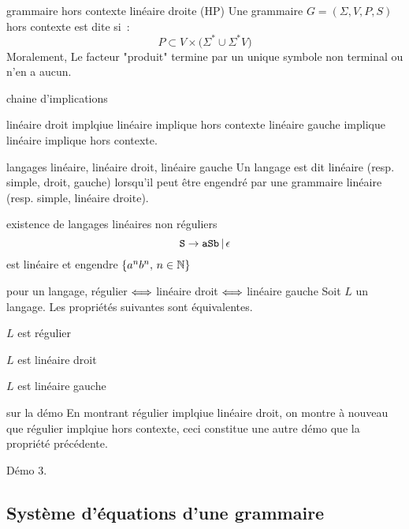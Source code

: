 \begin{adjustwidth}{-3cm}{-3cm}
\begin{definition}{}{grammaire hors contexte linéaire droite (HP)}
    Une grammaire $G = (\Sigma, V, P, S)$ hors contexte est dite  si~:
        $$P \subset V \times \big( \Sigma^* \cup \Sigma^*V \big)$$
    Moralement, Le facteur "produit" termine par un unique symbole non terminal ou n'en a aucun.
\end{definition}

\begin{remarque}{}{chaine d'implications}

    linéaire droit implqiue linéaire implique hors contexte
    linéaire gauche implique linéaire implique hors contexte.
    
\end{remarque}

\begin{definition}{}{langages linéaire, linéaire droit, linéaire gauche}
    Un langage est dit linéaire (resp. simple, droit, gauche) lorsqu'il peut être engendré par une grammaire linéaire (resp. simple, linéaire droite).
\end{definition}

\begin{remarque}{}{existence de langages linéaires non réguliers}
    $$\texttt{S} \rightarrow \texttt{aSb} \,\vert\, \epsilon$$ est linéaire et engendre $\{a^n b^n,\, n \in \mathbb{N}\}$
\end{remarque}

\begin{proposition}{}{pour un langage, régulier $\Longleftrightarrow$ linéaire droit $\Longleftrightarrow$ linéaire gauche} 
    Soit $L$ un langage. Les propriétés suivantes sont équivalentes.
    \begin{enumeratebf}
        \item $L$ est régulier
        \item $L$ est linéaire droit
        \item $L$ est linéaire gauche
    \end{enumeratebf}
\end{proposition}

\begin{remarque}{}{sur la démo}
    En montrant régulier implqiue linéaire droit, on montre à nouveau que régulier implqiue hors contexte, ceci constitue une autre démo que la propriété précédente.
\end{remarque}

Démo 3.

\subsection{Système d'équations d'une grammaire}


\end{adjustwidth}
